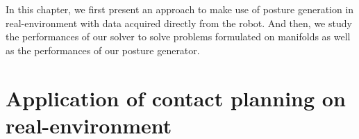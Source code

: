 



In this chapter, we first present an approach to make use of posture generation in real-environment with data acquired directly from the robot.
And then, we study the performances of our solver to solve problems formulated on manifolds as well as the performances of our posture generator.

\section{Application of contact planning on real-environment}
\label{sec:application_of_contact_planning_on_real_environment}

